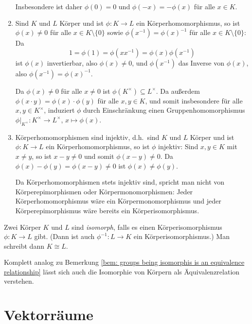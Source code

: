 \begin{bem}
\begin{enumerate}[leftmargin=*]
   Insbesondere ist daher $\phi(0) = 0$ und $\phi(-x) = -\phi(x)$ für alle $x \in K$.
  \item
   Sind $K$ und $L$ Körper und ist $\phi \colon K \to L$ ein Körperhomomorphismus, so ist $\phi(x) \neq 0$ für alle $x \in K \setminus \{0\}$ sowie $\phi(x^{-1}) = \phi(x)^{-1}$ für alle $x \in K \setminus \{0\}$: Da
   \[
    1 = \phi(1) = \phi(x x^{-1}) = \phi(x) \phi(x^{-1})
   \]
   ist $\phi(x)$ invertierbar, also $\phi(x) \neq 0$, und $\phi(x^{-1})$ das Inverse von $\phi(x)$, also $\phi(x^{-1}) = \phi(x)^{-1}$.
   
   Da $\phi(x) \neq 0$ für alle $x \neq 0$ ist $\phi(K^\times) \subseteq L^\times$. Da außerdem $\phi(x \cdot y) = \phi(x) \cdot \phi(y)$ für alle $x,y \in K$, und somit insbesondere für alle $x,y \in K^\times$, induziert $\phi$ durch Einschränkung einen Gruppenhomomorphismus $\phi|_{K^\times} \colon K^\times \to L^\times$, $x \mapsto \phi(x)$.
  \item
   Körperhomomorphismen sind injektiv, d.h.\ sind $K$ und $L$ Körper und ist $\phi \colon K \to L$ ein Körperhomomorphismus, so ist $\phi$ injektiv: Sind $x, y \in K$ mit $x \neq y$, so ist $x-y \neq 0$ und somit $\phi(x-y) \neq 0$. Da $\phi(x)-\phi(y) = \phi(x-y) \neq 0$ ist $\phi(x) \neq \phi(y)$.
   
   Da Körperhomomorphismen stets injektiv sind, spricht man nicht von Körperepimorphismen oder Körpermonomorphismen: Jeder Körperhomomorphismus wäre ein Körpermonomorphismus und jeder Körperepimorphismus wäre bereits ein Körperisomorphismus.
 \end{enumerate}
\end{bem}


\begin{defi}
 Zwei Körper $K$ und $L$ sind \emph{isomorph}, falls es einen Körperisomorphismus $\phi \colon K \to L$ gibt. (Dann ist auch $\phi^{-1} \colon L \to K$ ein Körperisomorphismus.) Man schreibt dann $K \cong L$.
\end{defi}


\begin{bem}
 Komplett analog zu Bemerkung \ref{bem: groups being isomorphis is an equivalence relationship} lässt sich auch die Isomorphie von Körpern als Äquivalenzrelation verstehen.
\end{bem}





\section{Vektorräume}


